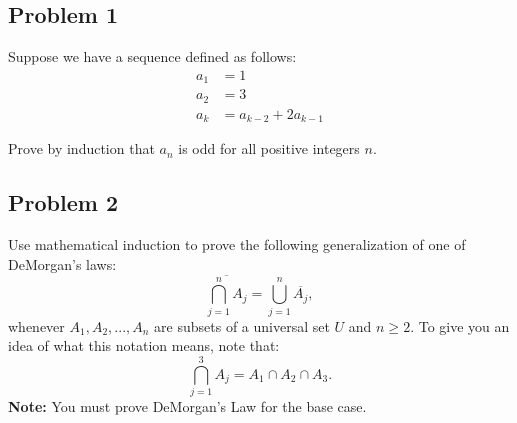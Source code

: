 \documentclass[12pt,letterpaper]{article}
\newcounter{enum22i}
\begin{document}
\subsection*{Problem 1}
{
\nopagebreak 

{\setcounter{enum22i}{0}

        Suppose we have a sequence defined as follows:
    	\begin{align*}
    		a_1 &= 1 \\
    		a_2 &= 3 \\
    		a_k &= a_{k-2} + 2a_{k-1}
    	\end{align*}

    	Prove by induction that $a_n$ is odd for all positive integers $n$.
    
}
}


\subsection*{Problem 2}
{

{\setcounter{enum22i}{0}
	Use mathematical induction to prove the following generalization of one of DeMorgan's laws:
			\[\overline{\bigcap_{j=1}^{n}{A_j}} = \bigcup_{j=1}^{n}{\overline{A_j}},\]
	whenever $A_1,A_2,...,A_n$ are subsets of a universal set $U$ and $n \geq 2$. To give you an idea of what this notation means, note that:
\[\bigcap_{j=1}^{3}{A_j} = A_1 \cap A_2 \cap A_3. \]
  \textbf{Note:} You must prove DeMorgan's Law for the base case.

}
}
\end{document}
